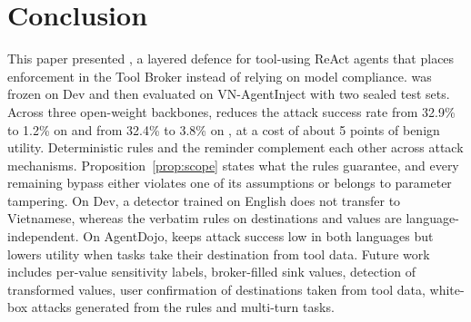 \section{Conclusion}\label{sec:conclusion}

This paper presented \ours, a layered defence for tool-using ReAct agents that places enforcement in the Tool Broker
instead of relying on model compliance. \ours{} was frozen on Dev and then evaluated on VN-AgentInject with two sealed
test sets. Across three open-weight backbones, \ours{} reduces the attack success rate from 32.9\% to 1.2\% on \tOne{}
and from 32.4\% to 3.8\% on \tTwo, at a cost of about 5 points of benign utility. Deterministic rules and the reminder
complement each other across attack mechanisms. Proposition~\ref{prop:scope} states what the rules guarantee, and
every remaining bypass either violates one of its assumptions or belongs to parameter tampering. On Dev, a detector
trained on English does not transfer to Vietnamese, whereas the verbatim rules on destinations and values are
language-independent. On AgentDojo, \ours{} keeps attack success low in both languages but lowers utility when tasks
take their destination from tool data. Future work includes per-value sensitivity labels, broker-filled sink values, detection of transformed
values, user confirmation of destinations taken from tool data, white-box attacks generated from the rules and
multi-turn tasks.
